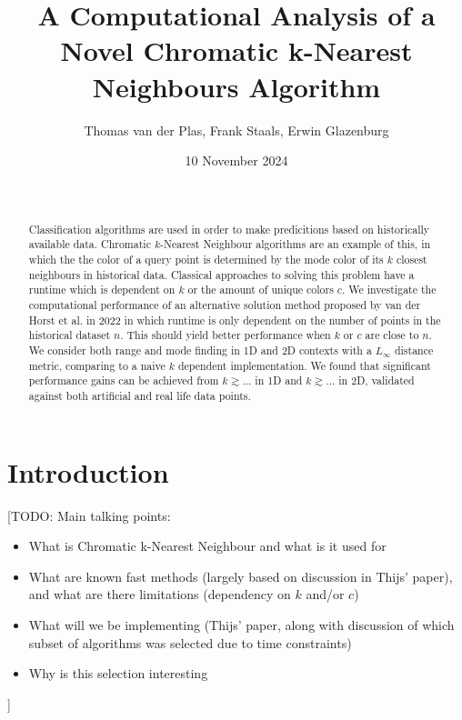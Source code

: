 \documentclass{article}
\title{A Computational Analysis of a Novel Chromatic k-Nearest Neighbours Algorithm}
\author{Thomas van der Plas, Frank Staals, Erwin Glazenburg}
\date{10 November 2024}
\newcommand{\todo}[1]{{\color{red}[#1]}}
\newcommand{\fb}[1]{{\color{blue}#1}}
\begin{document}
\maketitle

\begin{abstract}
    \noindent \todo{TODO: cijfers} \\\\
    \fb{Classification algorithms are used in order to make predicitions based on historically available data. Chromatic $k$-Nearest Neighbour algorithms are an example of this, in which the} the color of a query point is determined by the mode color of its $k$ closest neighbours \fb{in historical data}. Classical approaches to solving this problem have a runtime which is dependent on $k$ or the amount of unique colors $c$. \fb{We investigate the computational performance of an alternative solution method proposed by van der Horst et al. in 2022 in which runtime is only dependent on the number of points in the historical dataset $n$. This should yield better performance when $k$ or $c$ are close to $n$.}\\
    We consider both range and mode finding in 1D and 2D contexts with a $L_\infty$ distance metric, comparing to a naive $k$ dependent implementation. We found that significant performance gains can be achieved from $k \gtrsim ...$ in 1D and $k \gtrsim ...$ in 2D, validated against both artificial and real life data points.
\end{abstract}

\section{Introduction}
\todo{TODO: Main talking points:
    \begin{itemize}
        \item  What is Chromatic k-Nearest Neighbour and what is it used for
        \item What are known fast methods (largely based on discussion in Thijs' paper), and
              what are there limitations (dependency on $k$ and/or $c$)
        \item What will we be implementing (Thijs' paper, along with discussion of which
              subset of algorithms was selected due to time constraints)
        \item Why is this selection interesting
    \end{itemize}
}
\end{document}
